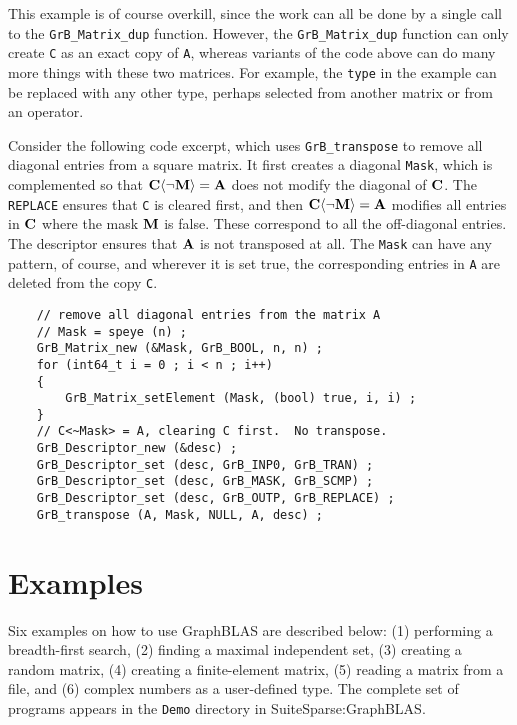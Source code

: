 \documentclass[12pt]{article}
\begin{document}
This example is of course overkill, since the work can all be done by a
single call to the \verb'GrB_Matrix_dup' function.  However, the
\verb'GrB_Matrix_dup' function can only create \verb'C' as an exact copy of
\verb'A', whereas variants of the code above can do many more things with these
two matrices.  For example, the \verb'type' in the example can be replaced with
any other type, perhaps selected from another matrix or from an operator.

Consider the following code excerpt, which uses \verb'GrB_transpose' to remove
all diagonal entries from a square matrix.  It first creates a diagonal
\verb'Mask', which is complemented so that ${\bf C \langle \neg M \rangle =A}$
does not modify the diagonal of ${\bf C}$.  The \verb'REPLACE' ensures that
\verb'C' is cleared first, and then ${\bf C \langle \neg M \rangle = A}$
modifies all entries in ${\bf C}$ where the mask ${\bf M}$ is false.  These
correspond to all the off-diagonal entries.  The descriptor ensures that ${\bf
A}$ is not transposed at all.  The \verb'Mask' can have any pattern, of course,
and wherever it is set true, the corresponding entries in \verb'A' are
deleted from the copy \verb'C'.

    {\footnotesize
    \begin{verbatim}
    // remove all diagonal entries from the matrix A
    // Mask = speye (n) ;
    GrB_Matrix_new (&Mask, GrB_BOOL, n, n) ;
    for (int64_t i = 0 ; i < n ; i++)
    {
        GrB_Matrix_setElement (Mask, (bool) true, i, i) ;
    }
    // C<~Mask> = A, clearing C first.  No transpose.
    GrB_Descriptor_new (&desc) ;
    GrB_Descriptor_set (desc, GrB_INP0, GrB_TRAN) ;
    GrB_Descriptor_set (desc, GrB_MASK, GrB_SCMP) ;
    GrB_Descriptor_set (desc, GrB_OUTP, GrB_REPLACE) ;
    GrB_transpose (A, Mask, NULL, A, desc) ; \end{verbatim}}

\newpage
\section{Examples} %
\label{examples}

Six examples on how to use GraphBLAS are described below:
(1) performing a breadth-first search,
(2) finding a maximal independent set,
(3) creating a random matrix,
(4) creating a finite-element matrix,
(5) reading a matrix from a file,
and
(6) complex numbers as a user-defined type.
The complete set of programs appears in the
\verb'Demo' directory in SuiteSparse:GraphBLAS.
\end{document}
